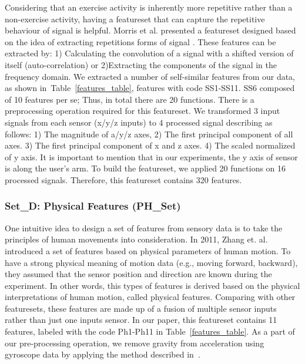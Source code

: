 \documentclass[journal,article,submit,moreauthors,pdftex]{Definitions/mdpi}
\begin{document}
Considering that an exercise activity is inherently more repetitive rather than a non-exercise activity, having a featureset that can capture the repetitive behaviour of signal is helpful. Morris et al. presented a featureset designed based on the idea of extracting repetitions forms of signal \cite{morris2014recofit}. These features can be extracted by: 1) Calculating the convolution of a signal with a shifted version of itself (auto-correlation) or 2)Extracting the components of the signal in the frequency domain. We extracted a number of self-similar features from our data, as shown in~Table~\ref{features_table}, features with code SS1-SS11. SS6 composed of 10 features per se; Thus, in total there are 20 functions.
There is a preprocessing operation required for this featureset. We transformed 3 input signals from each sensor (x/y/z inputs) to 4 processed signal describing as follows: 1) The magnitude of a/y/z axes, 2) The first principal component of all axes. 3) The first principal component of x and z axes. 4) The scaled normalized of y axis. It is important to mention that in our experiments, the y axis of sensor is along the user's arm. To build the featureset, we applied 20 functions on 16 processed signals. Therefore, this featureset contains 320 features.

\subsubsection{Set\_D: Physical Features (PH\_Set)}
One intuitive idea to design a set of features from sensory data is to take the principles of human movements into consideration. In 2011, Zhang et. al. ~\cite{zhang2011feature} introduced a set of features based on physical parameters of human motion. To have a strong physical meaning of motion data (e.g., moving forward, backward), they assumed that the sensor position and direction are known during the experiment. In other words, this types of features is derived based on the physical interpretations of human motion, called physical features. Comparing with other featuresets, these features are made up of a fusion of multiple sensor inputs rather than just one inputs sensor. In our paper, this featureset contains 11 features, labeled with the code Ph1-Ph11 in Table~\ref{features_table}. As a part of our pre-processing operation, we remove gravity from acceleration using gyroscope data by applying the method described in~\cite{Accelero5:online}.
\end{document}
